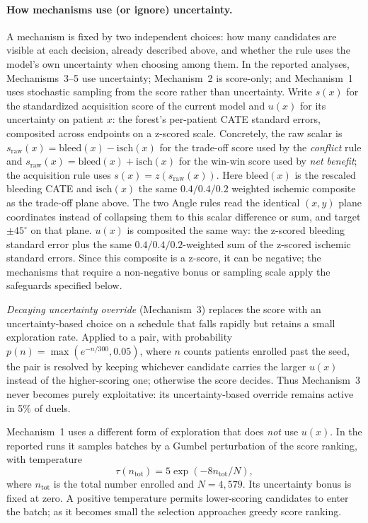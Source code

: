 \paragraph{How mechanisms use (or ignore) uncertainty.}
A mechanism is fixed by two independent choices: how many candidates are visible at each
decision, already described above, and whether the rule uses the model's own uncertainty
when choosing among them. In the reported analyses, Mechanisms~3--5 use uncertainty;
Mechanism~2 is score-only; and Mechanism~1 uses stochastic sampling from the score rather
than uncertainty. Write $s(x)$ for the standardized acquisition score of the current model
and $u(x)$ for its uncertainty on patient $x$: the forest's per-patient CATE standard
errors, composited across endpoints on a z-scored scale. Concretely, the raw scalar is
$s_{\mathrm{raw}}(x)=\text{bleed}(x)-\text{isch}(x)$ for the trade-off score used by the
\emph{conflict} rule and
$s_{\mathrm{raw}}(x)=\text{bleed}(x)+\text{isch}(x)$ for the win-win score used by
\emph{net benefit}; the acquisition rule uses $s(x)=z(s_{\mathrm{raw}}(x))$.
Here $\text{bleed}(x)$ is the rescaled bleeding CATE and $\text{isch}(x)$ the same
$0.4/0.4/0.2$ weighted ischemic composite as the trade-off plane above. The two Angle rules
read the identical $(x,y)$ plane coordinates instead of collapsing them to this scalar
difference or sum, and target $\pm45^\circ$ on that plane. $u(x)$ is composited the same way:
the z-scored bleeding standard error plus the same $0.4/0.4/0.2$-weighted sum of the
z-scored ischemic standard errors. Since this composite is a z-score, it can be negative;
the mechanisms that require a non-negative bonus or sampling scale apply the safeguards
specified below.

\vspace{10pt}

\emph{Decaying uncertainty override} (Mechanism~3) replaces the score with an
uncertainty-based choice on a schedule that falls rapidly but retains a small exploration
rate. Applied to a pair, with probability
$p(n) = \max(e^{-n/300}, 0.05)$, where $n$ counts patients enrolled past the seed, the
pair is resolved by keeping whichever candidate carries the larger $u(x)$ instead of the
higher-scoring one; otherwise the score decides. Thus Mechanism~3 never becomes purely
exploitative: its uncertainty-based override remains active in 5\% of duels.

Mechanism~1 uses a different form of exploration that does \emph{not} use $u(x)$. In the
reported runs it samples batches by a Gumbel perturbation of the score ranking, with
temperature
\[
  \tau(n_{\mathrm{tot}}) = 5\exp\!\left(-8n_{\mathrm{tot}}/N\right),
\]
where $n_{\mathrm{tot}}$ is the total number enrolled and $N=4{,}579$. Its uncertainty
bonus is fixed at zero. A positive temperature permits lower-scoring candidates to enter
the batch; as it becomes small the selection approaches greedy score ranking.

